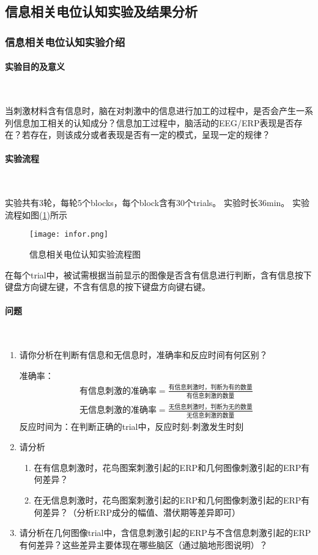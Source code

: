 \documentclass{hitreport}
\begin{document}
\subsection{信息相关电位认知实验及结果分析}

\subsubsection{信息相关电位认知实验介绍}

\paragraph{实验目的及意义}~{}

当刺激材料含有信息时，脑在对刺激中的信息进行加工的过程中，是否会产生一系列信息加工相关的认知成分？信息加工过程中，脑活动的EEG/ERP表现是否存在？若存在，则该成分或者表现是否有一定的模式，呈现一定的规律？

\paragraph{实验流程}~{}

实验共有3轮，每轮5个blocks，每个block含有30个trials。
实验时长36min。
实验流程如图(\ref{fig:labinfor})所示
\begin{figure}[htb]
\centering
\texttt{[image: infor.png]}
\caption{信息相关电位认知实验流程图}\label{fig:labinfor}
\end{figure}

在每个trial中，被试需根据当前显示的图像是否含有信息进行判断，含有信息按下键盘方向键左键，不含有信息的按下键盘方向键右键。

\paragraph{问题}~{}

\begin{enumerate}
\item 请你分析在判断有信息和无信息时，准确率和反应时间有何区别？

准确率：
\begin{align}
\text{有信息刺激的准确率} = \frac{\text{有信息刺激时，判断为有的数量}}{\text{有信息刺激的数量}}\\
\text{无信息刺激的准确率} = \frac{\text{无信息刺激时，判断为无的数量}}{\text{无信息刺激的数量}}
\end{align}
反应时间为：在判断正确的trial中，反应时刻-刺激发生时刻

\item 请分析
\begin{enumerate}
\item 在有信息刺激时，花鸟图案刺激引起的ERP和几何图像刺激引起的ERP有何差异？
\item 在无信息刺激时，花鸟图案刺激引起的ERP和几何图像刺激引起的ERP有何差异？（分析ERP成分的幅值、潜伏期等差异即可）
\end{enumerate}

\item 请分析在几何图像trial中，含信息刺激引起的ERP与不含信息刺激引起的ERP有何差异？这些差异主要体现在哪些脑区（通过脑地形图说明）？
\end{enumerate}
\end{document}
